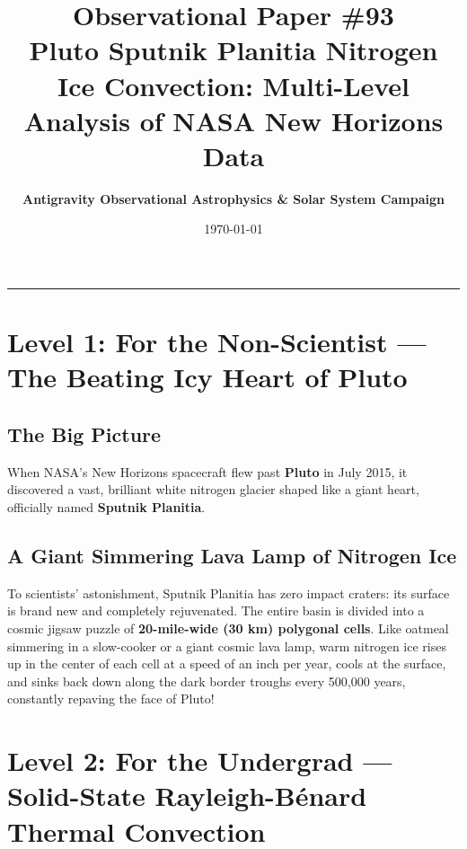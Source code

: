 \documentclass[11pt,a4paper]{article}
\title{\Huge \textbf{Observational Paper \#93}\\ \Large Pluto Sputnik Planitia Nitrogen Ice Convection: Multi-Level Analysis of NASA New Horizons Data}
\author{\textbf{Antigravity Observational Astrophysics \& Solar System Campaign}}
\date{\today}
\begin{document}
\maketitle

\vspace{-1em}
\begin{center}
\rule{\textwidth}{1.5pt}
\end{center}

\section*{Level 1: For the Non-Scientist — The Beating Icy Heart of Pluto}

\subsection*{The Big Picture}
When NASA's New Horizons spacecraft flew past \textbf{Pluto} in July 2015, it discovered a vast, brilliant white nitrogen glacier shaped like a giant heart, officially named \textbf{Sputnik Planitia}.

\subsection*{A Giant Simmering Lava Lamp of Nitrogen Ice}
To scientists' astonishment, Sputnik Planitia has zero impact craters: its surface is brand new and completely rejuvenated. The entire basin is divided into a cosmic jigsaw puzzle of \textbf{20-mile-wide (30 km) polygonal cells}. Like oatmeal simmering in a slow-cooker or a giant cosmic lava lamp, warm nitrogen ice rises up in the center of each cell at a speed of an inch per year, cools at the surface, and sinks back down along the dark border troughs every 500,000 years, constantly repaving the face of Pluto!

\newpage

\section*{Level 2: For the Undergrad — Solid-State Rayleigh-B\'enard Thermal Convection}
\end{document}
